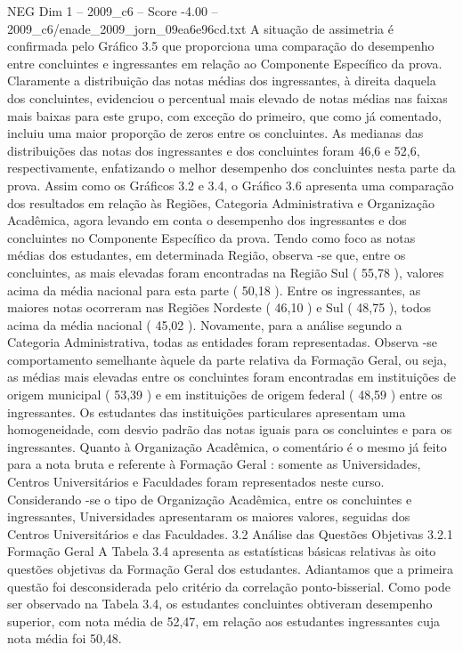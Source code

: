 \begin{textsample}{NEG Dim 1 – 2009\_c6 – Score -4.00 – 2009\_c6/enade\_2009\_jorn\_09ea6e96cd.txt}
A situação de assimetria é confirmada pelo Gráfico 3.5 que proporciona uma comparação do desempenho entre concluintes e ingressantes em relação ao Componente Específico da prova.
Claramente a distribuição das notas médias dos ingressantes, à direita daquela dos concluintes, evidenciou o percentual mais elevado de notas médias nas faixas mais baixas para este grupo, com exceção do primeiro, que como já comentado, incluiu uma maior proporção de zeros entre os concluintes.
As medianas das distribuições das notas dos ingressantes e dos concluintes foram 46,6 e 52,6, respectivamente, enfatizando o melhor desempenho dos concluintes nesta parte da prova.
Assim como os Gráficos 3.2 e 3.4, o Gráfico 3.6 apresenta uma comparação dos resultados em relação às Regiões, Categoria Administrativa e Organização Acadêmica, agora levando em conta o desempenho dos ingressantes e dos concluintes no Componente Específico da prova.
Tendo como foco as notas médias dos estudantes, em determinada Região, observa -se que, entre os concluintes, as mais elevadas foram encontradas na Região Sul ( 55,78 ), valores acima da média nacional para esta parte ( 50,18 ).
Entre os ingressantes, as maiores notas ocorreram nas Regiões Nordeste ( 46,10 ) e Sul ( 48,75 ), todos acima da média nacional ( 45,02 ).
Novamente, para a análise segundo a Categoria Administrativa, todas as entidades foram representadas.
Observa -se comportamento semelhante àquele da parte relativa da Formação Geral, ou seja, as médias mais elevadas entre os concluintes foram encontradas em instituições de origem municipal ( 53,39 ) e em instituições de origem federal ( 48,59 ) entre os ingressantes.
Os estudantes das instituições particulares apresentam uma homogeneidade, com desvio padrão das notas iguais para os concluintes e para os ingressantes.
Quanto à Organização Acadêmica, o comentário é o mesmo já feito para a nota bruta e referente à Formação Geral : somente as Universidades, Centros Universitários e Faculdades foram representados neste curso.
Considerando -se o tipo de Organização Acadêmica, entre os concluintes e ingressantes, Universidades apresentaram os maiores valores, seguidas dos Centros Universitários e das Faculdades. 3.2 Análise das Questões Objetivas 3.2.1 Formação Geral A Tabela 3.4 apresenta as estatísticas básicas relativas às oito questões objetivas da Formação Geral dos estudantes.
Adiantamos que a primeira questão foi desconsiderada pelo critério da correlação ponto-bisserial.
Como pode ser observado na Tabela 3.4, os estudantes concluintes obtiveram desempenho superior, com nota média de 52,47, em relação aos estudantes ingressantes cuja nota média foi 50,48.

\end{textsample}
